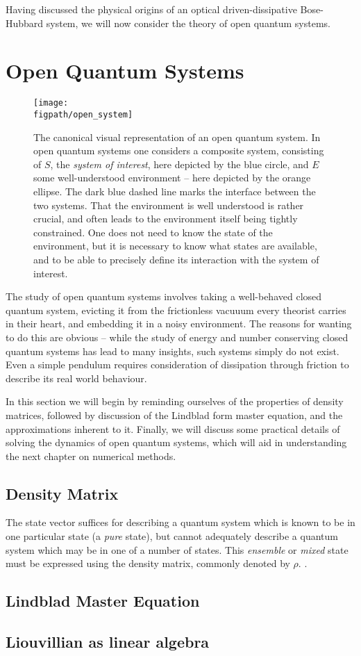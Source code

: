 Having discussed the physical origins of an optical driven-dissipative Bose-Hubbard system, we will now consider the theory of open quantum systems.

\section{Open Quantum Systems}

\begin{figure}[ht!]
\centering
\texttt{[image: \\figpath/open\_system]}
\caption{The canonical visual representation of an open quantum system. In open quantum systems one considers a composite system, consisting of \(S\), the \emph{system of interest}, here depicted by the blue circle, and \(E\) some well-understood environment -- here depicted by the orange ellipse. The dark blue dashed line marks the interface between the two systems. That the environment is well understood is rather crucial, and often leads to the environment itself being tightly constrained. One does not need to know the state of the environment, but it is necessary to know what states are available, and to be able to precisely define its interaction with the system of interest.}
\label{fig:oqs1-1}
\end{figure}

The study of open quantum systems involves taking a well-behaved closed quantum system, evicting it from the frictionless vacuuum every theorist carries in their heart, and embedding it in a noisy environment. The reasons for wanting to do this are obvious -- while the study of energy and number conserving closed quantum systems has lead to many insights, such systems simply do not exist. Even a simple pendulum requires consideration of dissipation through friction to describe its real world behaviour.  

In this section we will begin by reminding ourselves of the properties of density matrices, followed by discussion of the Lindblad form master equation, and the approximations inherent to it. Finally, we will discuss some practical details of solving the dynamics of open quantum systems, which will aid in understanding the next chapter on numerical methods.

\subsection{Density Matrix}
The state vector suffices for describing a quantum system which is known to be in one particular state (a \emph{pure} state), but cannot adequately describe a quantum system which may be in one of a number of states. This \emph{ensemble} or \emph{mixed} state must be expressed using the density matrix, commonly denoted by \(\rho\).  \cite{NielsenChuang_DM}. 

\subsection{Lindblad Master Equation}

\subsection{Liouvillian as linear algebra}   
